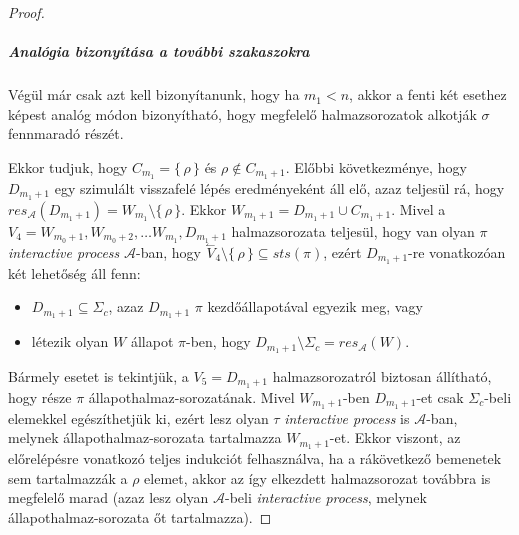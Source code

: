 \documentclass[12pt]{article}
\theoremstyle{definition}
\theoremstyle{remark}
\theoremstyle{plain}
\theoremstyle{plain}
\let\emptyset\varnothing
\newcommand{\backwardhat}{\overset{\leftharpoonup}}
\newcommand{\res}{\textit{res}}
\begin{document}
\begin{proof}
        \subparagraph{Analógia bizonyítása a további szakaszokra}
        Végül már csak azt kell bizonyítanunk, hogy ha $m_{1} < n$, akkor a fenti két esethez képest analóg módon bizonyítható, hogy megfelelő halmazsorozatok alkotják $\sigma$ fennmaradó részét. 

        Ekkor tudjuk, hogy $C_{m_{1}} = \{\,\rho\,\}$ és $\rho \notin C_{m_{1} + 1}$. Előbbi következménye, hogy $D_{m_{1} + 1}$ egy szimulált visszafelé lépés eredményeként áll elő, azaz teljesül rá, hogy $\res_{\mathscr{A}}(D_{m_{1} + 1}) = W_{m_{1}} \setminus \{\,\rho\,\}$. Ekkor $W_{m_{1} + 1} = D_{m_{1} + 1} \cup C_{m_{1} + 1}$. Mivel a $V_{4} = W_{m_{0} + 1}, W_{m_{0} + 2}, \ldots W_{m_{1}}, D_{m_{1} + 1}$ halmazsorozata teljesül, hogy van olyan $\pi$ \textit{interactive process} $\mathscr{A}$-ban, hogy $\backwardhat V_{4} \setminus \{\,\rho\,\} \subseteq \textit{sts}(\pi)$, ezért $D_{m_{1} + 1}$-re vonatkozóan két lehetőség áll fenn:
        \begin{itemize}
            \item
            $D_{m_{1} + 1} \subseteq \Sigma_{c}$, azaz $D_{m_{1} + 1}$ $\pi$ kezdőállapotával egyezik meg, vagy
        
            \item
            létezik olyan $W$ állapot $\pi$-ben, hogy $D_{m_{1} + 1} \setminus \Sigma_{c} = \res_{\mathscr{A}}(W)$.
        \end{itemize}
        Bármely esetet is tekintjük, a $V_{5} = D_{m_{1} + 1}$ halmazsorozatról biztosan állítható, hogy része $\pi$ állapothalmaz-sorozatának. Mivel $W_{m_{1} + 1}$-ben $D_{m_{1} + 1}$-et csak $\Sigma_{c}$-beli elemekkel egészíthetjük ki, ezért lesz olyan $\tau$ \textit{interactive process} is $\mathscr{A}$-ban, melynek állapothalmaz-sorozata tartalmazza $W_{m_{1} + 1}$-et. Ekkor viszont, az előrelépésre vonatkozó teljes indukciót felhasználva, ha a rákövetkező bemenetek sem tartalmazzák a $\rho$ elemet, akkor az így elkezdett halmazsorozat továbbra is megfelelő marad (azaz lesz olyan $\mathscr{A}$-beli \textit{interactive process}, melynek állapothalmaz-sorozata őt tartalmazza).
        

\end{proof}
\end{document}
